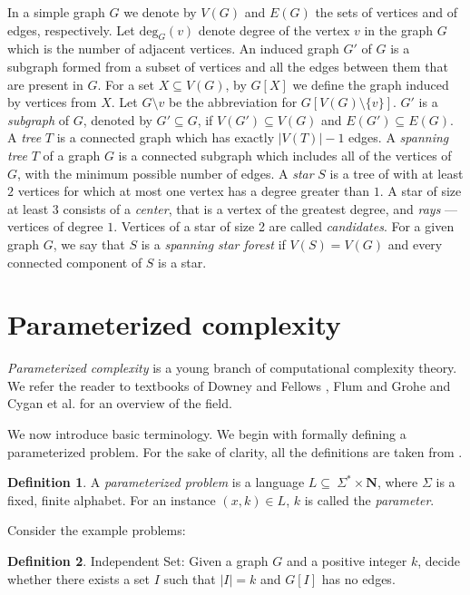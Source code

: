 \documentclass[en]{pracamgr}
\theoremstyle{definition}
\newtheorem{definition}{Definition}
\newcommand{\ssf}{spanning star forest}
\newcommand{\indset}{{\sc Independent Set}}
\newcommand{\degree}[2]{\textrm{deg}_{#1}(#2)}
\begin{document}
In a simple graph $G$ we denote by $V(G)$ and $E(G)$ the sets of vertices and of edges, respectively. 
Let $\degree{G}{v}$ denote degree of the vertex $v$ in the graph $G$ which is the number of adjacent vertices. 
An induced graph $G'$ of $G$ is a subgraph formed from a subset of vertices and all the edges between them that are present in $G$. 
For a set $X \subseteq V(G)$, by $G[X]$ we define the graph induced by vertices from $X$. 
Let $G \setminus v$ be the abbreviation for $G[V(G) \setminus \{v\}]$.
$G'$ is a \emph{subgraph} of $G$, denoted by $G' \subseteq G$, if $V(G') \subseteq V(G)$ and $E(G') \subseteq E(G)$.
A \emph{tree} $T$ is a connected graph which has exactly $|V(T)|-1$ edges. 
A \emph{spanning tree} $T$ of a graph $G$ is a connected subgraph which includes all of the vertices of $G$, with the minimum possible number of edges.
A \emph{star} $S$ is a tree of with at least $2$ vertices for which at most one vertex has a degree greater than $1$. 
A star of size at least $3$ consists of a \emph{center}, that is a vertex of the greatest degree, and \emph{rays} --- vertices of degree $1$. 
Vertices of a star of size 2 are called \emph{candidates}.
For a given graph $G$, we say that $S$ is a \emph{\ssf{}} if $V(S)=V(G)$ and every connected component of $S$ is a star.

\section{Parameterized complexity}

\emph{Parameterized complexity} is a young branch of computational complexity theory. We refer the reader to textbooks of Downey and Fellows \cite{ParComp}, Flum and Grohe \cite{ParCompThm} and Cygan et al. \cite{ParAlg} for an overview of the field.

We now introduce basic terminology. We begin with formally defining a parameterized problem. For the sake of clarity, all the definitions are taken from \cite{ParAlg}.

\begin{definition}\label{Parameterized problem}
	A \textit{parameterized problem} is a language $L \subseteq \ \Sigma^* \times \mathbf{N}$, where $\Sigma$ is a fixed, finite alphabet. For an instance $(x,k) \in L$, $k$ is called the \textit{parameter}.
\end{definition}

\noindent
Consider the example problems:

\begin{definition}
	\indset{}: Given a graph $G$ and a positive integer $k$, decide whether there exists a set $I$ such that $|I|=k$ and $G[I]$ has no edges.
\end{definition}
\end{document}

